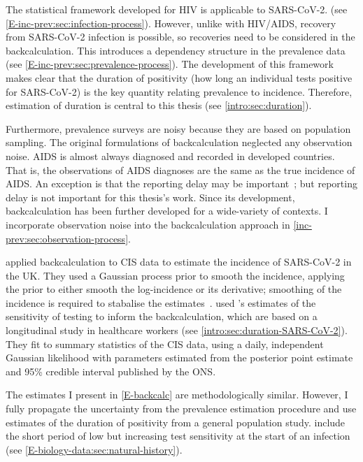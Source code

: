 \documentclass[thesis.tex]{subfiles}
\begin{document}
The statistical framework developed for HIV is applicable to SARS-CoV-2.
(see \cref{E-inc-prev:sec:infection-process}).
However, unlike with HIV/AIDS, recovery from SARS-CoV-2 infection is possible, so recoveries need to be considered in the backcalculation.
This introduces a dependency structure in the prevalence data (see \cref{E-inc-prev:sec:prevalence-process}).
The development of this framework makes clear that the duration of positivity (how long an individual tests positive for SARS-CoV-2) is the key quantity relating prevalence to incidence.
Therefore, estimation of duration is central to this thesis (see \cref{intro:sec:duration}).

Furthermore, prevalence surveys are noisy because they are based on population sampling.
The original formulations of backcalculation neglected any observation noise.
AIDS is almost always diagnosed and recorded in developed countries.
That is, the observations of AIDS diagnoses are the same as the true incidence of AIDS.
An exception is that the reporting delay may be important~\autocite{paganoHIV}; but reporting delay is not important for this thesis's work.
Since its development, backcalculation has been further developed for a wide-variety of contexts.
I incorporate observation noise into the backcalculation approach in \cref{inc-prev:sec:observation-process}.

\Textcite{abbottCISincidence} applied backcalculation to CIS data to estimate the incidence of SARS-CoV-2 in the UK.
They used a Gaussian process prior to smooth the incidence, applying the prior to either smooth the log-incidence or its derivative; smoothing of the incidence is required to stabalise the estimates~\autocite{brookmeyerBackcalculation}.
\Textcite{abbottCISincidence} used \textcite{hellewellPCRSensitivity}'s estimates of the sensitivity of testing to inform the backcalculation, which are based on a longitudinal study in healthcare workers (see \cref{intro:sec:duration-SARS-CoV-2}).
They fit to summary statistics of the CIS data, using a daily, independent Gaussian likelihood with parameters estimated from the posterior point estimate and 95\% credible interval published by the ONS.

The estimates I present in \cref{E-backcalc} are methodologically similar.
However, I fully propagate the uncertainty from the prevalence estimation procedure and use estimates of the duration of positivity from a general population study.
\Textcite{abbottCISincidence} include the short period of low but increasing test sensitivity at the start of an infection (see \cref{E-biology-data:sec:natural-history}).
\end{document}
